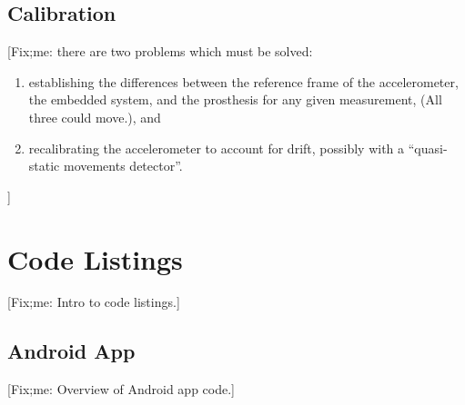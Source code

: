 \documentclass[11pt, a4paper, oneside, english]{scrbook}
\begin{document}
\section{Calibration} %
\label{sec:calibration}
[Fix;me: there are two problems which must be solved:
\begin{enumerate}
\item establishing the differences between the reference frame of the accelerometer, the embedded system, and the prosthesis for any given measurement, (All three could move.), and
\item recalibrating the accelerometer to account for drift, possibly with a ``quasi-static movements detector''.
\end{enumerate}]
\chapter{Code Listings} %
\label{cha:code_listings}
[Fix;me: Intro to code listings.]
\section{Android App} %
\label{sec:android_app}
[Fix;me: Overview of Android app code.]

\newpage

\newpage

\newpage



\end{document}
